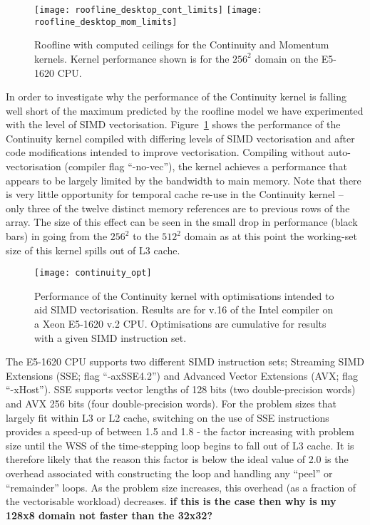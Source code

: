 \documentclass[12pt]{article}
\begin{document}
\begin{figure}
  \centering
  \texttt{[image: roofline\_desktop\_cont\_limits]}
  \texttt{[image: roofline\_desktop\_mom\_limits]}
  \caption{Roofline with computed ceilings for the Continuity and
    Momentum kernels.
    Kernel performance shown
    is for the $256^2$ domain on the E5-1620 CPU.}
\end{figure}

In order to investigate why the performance of the Continuity kernel
is falling well short of the maximum predicted by the roofline model
we have experimented with the level of SIMD
vectorisation. Figure~\ref{FIG_cont_vec} shows the performance of the
Continuity kernel compiled with differing levels of SIMD vectorisation
and after code modifications intended to improve vectorisation.
Compiling without auto-vectorisation (compiler flag ``-no-vec''), the
kernel achieves a performance that appears to be largely limited by
the bandwidth to main memory. Note that there is very little
opportunity for temporal cache re-use in the Continuity kernel -- only
three of the twelve distinct memory references are to previous rows of
the array. The size of this effect can be seen in the small drop in
performance (black bars) in going from the $256^2$ to the $512^2$
domain as at this point the working-set size of this kernel spills out
of L3 cache.

\begin{figure}
  \centering
  \texttt{[image: continuity\_opt]}
  \caption{Performance of the Continuity kernel with optimisations
    intended to aid SIMD vectorisation. Results are for v.16 of the
    Intel compiler on a Xeon E5-1620 v.2 CPU. Optimisations are
    cumulative for results with a given SIMD instruction set.}
  \label{FIG_cont_vec}
\end{figure}

The E5-1620 CPU supports two different SIMD instruction sets;
Streaming SIMD Extensions (SSE; flag ``-axSSE4.2'') and Advanced
Vector Extensions (AVX; flag ``-xHost''). SSE supports vector lengths
of 128 bits (two double-precision words) and AVX 256 bits (four
double-precision words). For the problem sizes that largely fit within
L3 or L2 cache, switching on the use of SSE instructions provides a
speed-up of between 1.5 and 1.8 - the factor increasing with problem
size until the WSS of the time-stepping loop begins to fall out of L3
cache. It is therefore likely that the reason this factor is below the
ideal value of 2.0 is the overhead associated with constructing the
loop and handling any ``peel'' or ``remainder'' loops. As the problem
size increases, this overhead (as a fraction of the vectorisable
workload) decreases. {\bf if this is the case then why is my 128x8 domain
not faster than the 32x32?}
\end{document}

